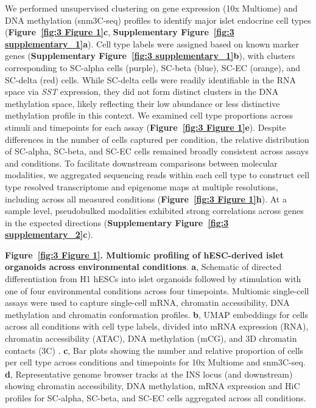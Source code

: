 We performed unsupervised clustering on gene expression (10x Multiome) and DNA methylation (snm3C-seq) profiles to identify major islet endocrine cell types (\textbf{Figure~\ref{fig:3 Figure 1}\textbf{c}}, \textbf{Supplementary Figure~\ref{fig:3 supplementary_1}\textbf{a}}). Cell type labels were assigned based on known marker genes (\textbf{Supplementary Figure~\ref{fig:3 supplementary_1}\textbf{b}}), with clusters corresponding to SC-alpha cells (purple), SC-beta (blue), SC-EC (orange), and SC-delta (red) cells. While SC-delta cells were readily identifiable in the RNA space via \textit{SST} expression, they did not form distinct clusters in the DNA methylation space, likely reflecting their low abundance or less distinctive methylation profile in this context. We examined cell type proportions across stimuli and timepoints for each assay (\textbf{Figure~\ref{fig:3 Figure 1}\textbf{e}}). Despite differences in the number of cells captured per condition, the relative distribution of SC-alpha, SC-beta, and SC-EC cells remained broadly consistent across assays and conditions. To facilitate downstream comparisons between molecular modalities, we aggregated sequencing reads within each cell type to construct cell type resolved transcriptome and epigenome maps at multiple resolutions, including across all measured conditions (\textbf{Figure~\ref{fig:3 Figure 1}\textbf{h}}). At a sample level, pseudobulked modalities exhibited strong correlations across genes in the expected directions (\textbf{Supplementary Figure~\ref{fig:3 supplementary_2}\textbf{c}}).

\clearpage
\thispagestyle{plain}
\noindent
\textbf{Figure~\ref{fig:3 Figure 1}. Multiomic profiling of hESC-derived islet organoids across environmental conditions}. \textbf{a}, Schematic of directed differentiation from H1 hESCs into islet organoids followed by stimulation with one of four environmental conditions across four timepoints. Multiomic single-cell assays were used to capture single-cell mRNA, chromatin accessibility, DNA methylation and chromatin conformation profiles. \textbf{b}, UMAP embeddings for cells across all conditions with cell type labels, divided into mRNA expression (RNA), chromatin accessibility (ATAC), DNA methylation (mCG), and 3D chromatin contacts (3C) . \textbf{c}, Bar plots showing the number and relative proportion of cells per cell type across conditions and timepoints for 10x Multiome and snm3C-seq. \textbf{d}, Representative genome browser tracks at the INS locus (and downstream) showing chromatin accessibility, DNA methylation, mRNA expression and HiC profiles for SC-alpha, SC-beta, and SC-EC cells aggregated across all conditions.

